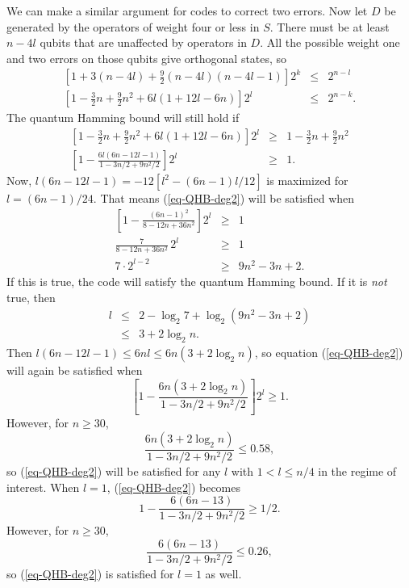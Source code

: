We can make a similar argument for codes to correct two errors.  Now let $D$
be generated by the operators of weight four or less in $S$.  There must be
at least $n-4l$ qubits that are unaffected by operators in $D$.  All the
possible weight one and two errors on those qubits give orthogonal states, so
\begin{eqnarray}
	\left[1 + 3(n-4l) + \frac{9}{2} (n-4l) (n-4l-1)\right] 2^k & \leq & 2^{n-l} \\
	\left[1 - \frac{3}{2} n + \frac{9}{2} n^2 + 6 l (1 + 12 l - 6 n)\right] 2^l & \leq & 2^{n-k}.
\end{eqnarray}
The quantum Hamming bound will still hold if
\begin{eqnarray}
	\left[1 - \frac{3}{2}n + \frac{9}{2} n^2 + 6 l (1 + 12 l - 6 n)\right] 2^l &
	\geq & 1 - \frac{3}{2}n + \frac{9}{2} n^2 \\
	\left[ 1 - \frac{6l (6n - 12 l - 1)}{1 - 3n/2 + 9n^2/2} \right] 2^l & \geq & 1.
	\label{eq-QHB-deg2}
\end{eqnarray}
Now, $l (6n - 12 l - 1) = -12 [l^2 - (6n-1) l /12]$ is maximized for $l = (6n-
1)/24$.  That means (\ref{eq-QHB-deg2}) will be satisfied when
\begin{eqnarray}
	\left[ 1 - \frac{(6n - 1)^2}{8 - 12n + 36n^2} \right] 2^l & \geq & 1 \\
	\frac{7}{8 - 12n + 36n^2}\,2^l & \geq & 1 \\
	7 \cdot 2^{l-2} & \geq & 9n^2 - 3n + 2.
\end{eqnarray}
If this is true, the code will satisfy the quantum Hamming bound.  If it is
	{\em not} true, then
\begin{eqnarray}
	l & \leq & 2 - \log_2 7 + \log_2 (9n^2 - 3n + 2) \\
	& \leq & 3 + 2 \log_2 n.
\end{eqnarray}
Then $l (6n - 12l - 1) \leq 6 n l \leq 6 n (3 + 2 \log_2 n)$, so equation
(\ref{eq-QHB-deg2}) will again be satisfied when
\begin{equation}
	\left[ 1 - \frac{6 n (3 + 2 \log_2 n)}{1 - 3n/2 + 9n^2/2} \right] 2^l \geq 1.
\end{equation}
However, for $n \geq 30$,
\begin{equation}
	\frac{6 n (3 + 2 \log_2 n)}{1 - 3n/2 + 9n^2/2} \leq 0.58,
\end{equation}
so (\ref{eq-QHB-deg2}) will be satisfied for any $l$ with $1 < l \leq n/4$
in the regime of interest.  When $l=1$, (\ref{eq-QHB-deg2}) becomes
\begin{equation}
	1 - \frac{6 (6n - 13)}{1 - 3n/2 + 9n^2/2} \geq 1/2.
\end{equation}
However, for $n \geq 30$,
\begin{equation}
	\frac{6 (6n - 13)}{1 - 3n/2 + 9n^2/2} \leq 0.26,
\end{equation}
so (\ref{eq-QHB-deg2}) is satisfied for $l=1$ as well.

